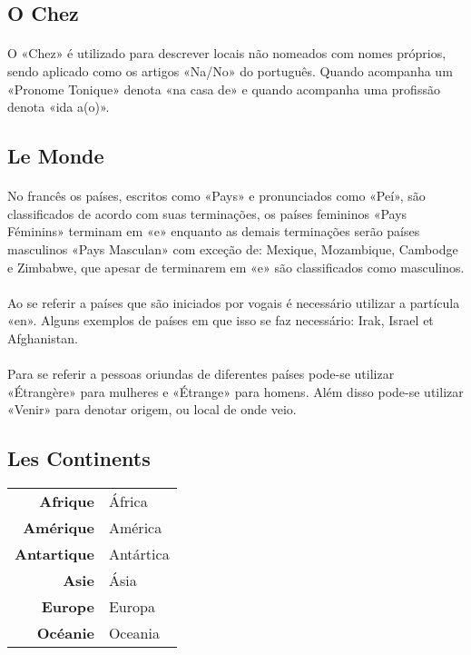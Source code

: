 \documentclass{article}
\begin{document}
    \subsection{O Chez}
        \paragraph{}O «Chez» é utilizado para descrever locais não nomeados com nomes próprios, sendo aplicado como os artigos «Na/No» do português. Quando acompanha um «Pronome Tonique» denota «na casa de» e quando acompanha uma profissão denota «ida a(o)».
    
    \subsection{Le Monde}
        \paragraph{}No francês os países, escritos como «Pays» e pronunciados como «Peí», são classificados de acordo com suas terminações, os países femininos «Pays Féminins» terminam em «e» enquanto as demais terminações serão países masculinos «Pays Masculan» com exceção de: Mexique, Mozambique, Cambodge e Zimbabwe, que apesar de terminarem em «e» são classificados como masculinos.
        
        \paragraph{}Ao se referir a países que são iniciados por vogais é necessário utilizar a partícula «en». Alguns exemplos de países em que isso se faz necessário: Irak, Israel et Afghanistan.
        
        \paragraph{}Para se referir a pessoas oriundas de diferentes países pode-se utilizar «Étrangère» para mulheres e «Étrange» para homens. Além disso pode-se utilizar «Venir» para denotar origem, ou local de onde veio.
    
    \subsection{Les Continents}
        \begin{center}
            \begin{tabular}{r l}
                \textbf{Afrique}    & África\\
                \textbf{Amérique}   & América\\
                \textbf{Antartique} & Antártica\\
                \textbf{Asie}       & Ásia\\
                \textbf{Europe}     & Europa\\
                \textbf{Océanie}    & Oceania\\
            \end{tabular}
        \end{center}
\end{document}
